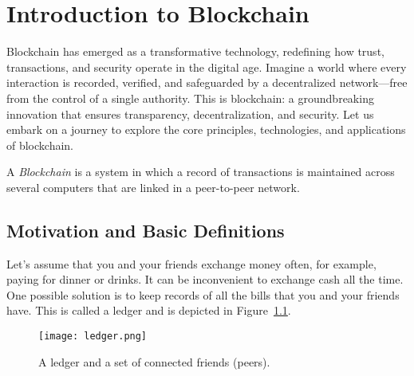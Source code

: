 \documentclass[12pt,a4paper]{report}
\begin{document}
\renewcommand{\contentsname}{\color{headercolor}\textbf{Table of Contents}}
\tableofcontents

\chapter{Introduction to Blockchain}

Blockchain has emerged as a transformative technology, redefining how trust, transactions, and security operate in the digital age. Imagine a world where every interaction is recorded, verified, and safeguarded by a decentralized network—free from the control of a single authority. This is blockchain: a groundbreaking innovation that ensures transparency, decentralization, and security. Let us embark on a journey to explore the core principles, technologies, and applications of blockchain.

\vspace{0.5em}

\begin{tcolorbox}[colframe=black!75, colback=white, sharp corners, fonttitle=\bfseries, boxrule=0.5pt, title=\faInfoCircle\ Definition 1-1]
A \textit{Blockchain} is a system in which a record of 
transactions is maintained across several computers that are linked in a peer-to-peer network.
\end{tcolorbox}

\section{Motivation and Basic Definitions}

Let’s assume that you and your friends exchange money often, for 
example, paying for dinner or drinks. It can be inconvenient to exchange 
cash all the time. One possible solution is to keep records of all the bills that you and 
your friends have. This is called a ledger and is depicted in Figure~\ref{fig:ledger}.

\begin{figure}[h!]
    \centering
    \texttt{[image: ledger.png]}
    \caption{A ledger and a set of connected friends (peers).}
    \label{fig:ledger}
\end{figure}

\vspace{0.5em}
\end{document}
